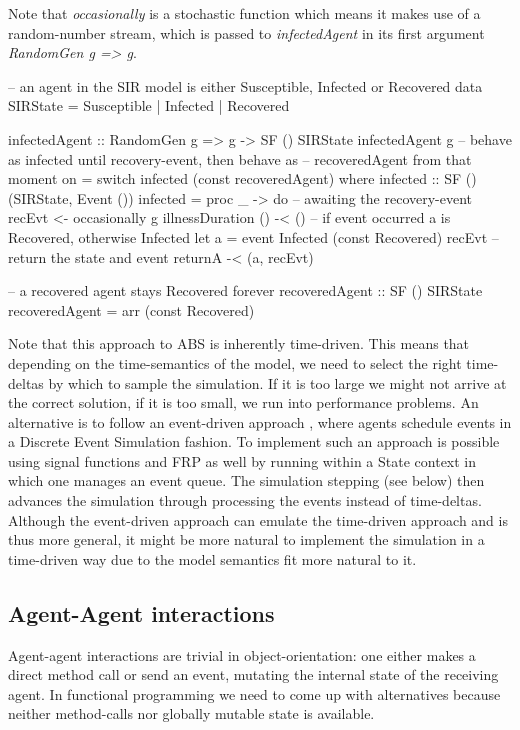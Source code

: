 Note that \textit{occasionally} is a stochastic function which means it makes use of a random-number stream, which is passed to \textit{infectedAgent} in its first argument \textit{RandomGen g => g}.

\begin{HaskellCode}
-- an agent in the SIR model is either Susceptible, Infected or Recovered
data SIRState = Susceptible | Infected | Recovered

infectedAgent :: RandomGen g => g -> SF () SIRState
infectedAgent g 
    -- behave as infected until recovery-event, then behave as
    -- recoveredAgent from that moment on    
    = switch infected (const recoveredAgent)
  where
    infected :: SF () (SIRState, Event ())
    infected = proc _ -> do
      -- awaiting the recovery-event
      recEvt <- occasionally g illnessDuration () -< ()
      -- if event occurred a is Recovered, otherwise Infected
      let a = event Infected (const Recovered) recEvt
      -- return the state and event
      returnA -< (a, recEvt)

-- a recovered agent stays Recovered forever
recoveredAgent :: SF () SIRState
recoveredAgent = arr (const Recovered)
\end{HaskellCode}

Note that this approach to ABS is inherently time-driven. This means that depending on the time-semantics of the model, we need to select the right time-deltas by which to sample the simulation. If it is too large we might not arrive at the correct solution, if it is too small, we run into performance problems. An alternative is to follow an event-driven approach \cite{meyer_event-driven_2014}, where agents schedule events in a Discrete Event Simulation fashion. To implement such an approach is possible using signal functions and FRP as well by running within a State context in which one manages an event queue. The simulation stepping (see below) then advances the simulation through processing the events instead of time-deltas. Although the event-driven approach can emulate the time-driven approach and is thus more general, it might be more natural to implement the simulation in a time-driven way due to the model semantics fit more natural to it.

\subsection{Agent-Agent interactions}
Agent-agent interactions are trivial in object-orientation: one either makes a direct method call or send an event, mutating the internal state of the receiving agent. In functional programming we need to come up with alternatives because neither method-calls nor globally mutable state is available.

